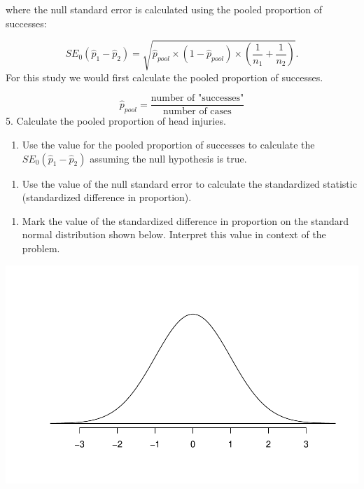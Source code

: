 \documentclass[
]{report}
\providecommand{\tightlist}{%
  \setlength{\itemsep}{0pt}\setlength{\parskip}{0pt}}
\begin{document}
where the null standard error is calculated using the pooled proportion of successes:

\[
SE_0(\hat{p}_1-\hat{p}_2)=\sqrt{\hat{p}_{pool}\times (1-\hat{p}_{pool})\times \left(\frac{1}{n_1}+\frac{1}{n_2}\right)}.
\]
For this study we would first calculate the pooled proportion of successes.

\[\hat{p}_{pool} = \frac{\text{number of "successes"}}{\text{number of cases}} \]
5. Calculate the pooled proportion of head injuries.

\vspace{0.8in}

\begin{enumerate}
\def\labelenumi{\arabic{enumi}.}
\setcounter{enumi}{5}
\tightlist
\item
  Use the value for the pooled proportion of successes to calculate the \(SE_0(\hat{p}_1 - \hat{p}_2)\) assuming the null hypothesis is true.
\end{enumerate}

\vspace{1in}

\begin{enumerate}
\def\labelenumi{\arabic{enumi}.}
\setcounter{enumi}{6}
\tightlist
\item
  Use the value of the null standard error to calculate the standardized statistic (standardized difference in proportion).
\end{enumerate}

\vspace{0.8in}

\begin{enumerate}
\def\labelenumi{\arabic{enumi}.}
\setcounter{enumi}{7}
\tightlist
\item
  Mark the value of the standardized difference in proportion on the standard normal distribution shown below. Interpret this value in context of the problem.
\end{enumerate}

\vspace{1mm}

\begin{center}\includegraphics[width=0.5\linewidth]{09-A19-inference-2cat-theory_files/figure-latex/simpleNormal-1} \end{center}
\end{document}
